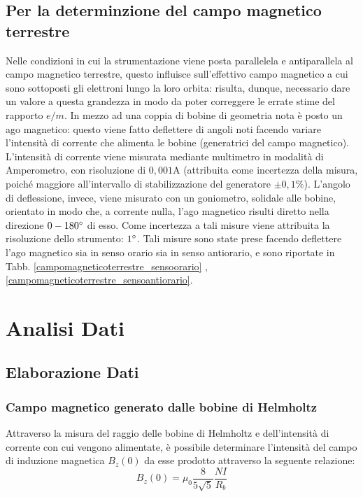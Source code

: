 \documentclass[]{article}
\let\oldsection\section%
\renewcommand{\section}{%
	\renewcommand{\theequation}{\thesection.\arabic{equation}}%
	\oldsection}%
\let\oldsubsection\subsection%
\renewcommand{\subsection}{%
	\renewcommand{\theequation}{\thesubsection.\arabic{equation}}%
	\oldsubsection}%
\begin{document}
    \subsection{Per la determinzione del campo magnetico terrestre}
    Nelle condizioni in cui la strumentazione viene posta parallelela e antiparallela al campo magnetico terrestre, questo influisce sull'effettivo campo magnetico a cui sono sottoposti gli elettroni lungo la loro orbita: risulta, dunque, necessario dare un valore a questa grandezza in modo da poter correggere le errate stime del rapporto $e/m$. In mezzo ad una coppia di bobine di geometria nota è posto un ago magnetico: questo viene fatto deflettere di angoli noti facendo variare l'intensità di corrente che alimenta le bobine (generatrici del campo magnetico). L'intensità di corrente viene misurata mediante multimetro in modalità di Amperometro, con risoluzione di $0,001 \text{A}$ (attribuita come incertezza della misura, poiché maggiore all'intervallo di stabilizzazione del generatore $\pm 0,1 \%$). L'angolo di deflessione, invece, viene misurato con un goniometro, solidale alle bobine, orientato in modo che, a corrente nulla, l'ago magnetico risulti diretto nella direzione $0-180 \degree $ di esso. Come incertezza a tali misure viene attribuita la risoluzione dello strumento: $1 \degree$. Tali misure sono state prese facendo deflettere l'ago magnetico sia in senso orario sia in senso antiorario, e sono riportate in Tabb. \ref{campomagneticoterrestre_sensoorario} , \ref{campomagneticoterrestre_sensoantiorario}.
    

    \section {Analisi Dati}

    \subsection{Elaborazione Dati}
    \subsubsection{Campo magnetico generato dalle bobine di Helmholtz}
    Attraverso la misura del raggio delle bobine di Helmholtz e dell'intensità di corrente con cui vengono alimentate, è possibile determinare l'intensità del campo di induzione magnetica $B_z(0)$ da esse prodotto attraverso la seguente relazione:
    \begin{equation}
        \label{B_z0}
        B_z (0) = \mu _0 \frac{8}{5\sqrt{5}} \frac{NI}{R_b}
    \end{equation} 
\end{document}
